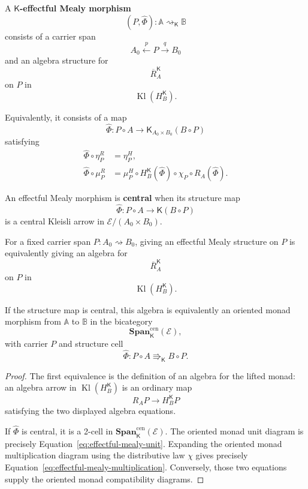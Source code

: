 \begin{definition}
\label{def:effectful-mealy-morphism}
A \textbf{\(\mathsf K\)-effectful Mealy morphism}
\[
    (P,\widehat\Phi):
    \mathbb A\rightsquigarrow_{\mathsf K}\mathbb B
\]
consists of a carrier span
\[
    A_0\xleftarrow{p}P\xrightarrow{q}B_0
\]
and an algebra structure for
\[
    \overline R_A^{\mathsf K}
\]
on \(P\) in
\[
    \operatorname{Kl}(H_B^{\mathsf K}).
\]

Equivalently, it consists of a map
\[
    \widehat\Phi:
    P\circ A
    \longrightarrow
    \mathsf K_{A_0\times B_0}(B\circ P)
\]
satisfying
\begin{align}
    \widehat\Phi\circ\eta^R_P
    &=
    \eta^H_P,
    \label{eq:effectful-mealy-unit}
    \\
    \widehat\Phi\circ\mu^R_P
    &=
    \mu^H_P
    \circ
    H_B^{\mathsf K}(\widehat\Phi)
    \circ
    \chi_P
    \circ
    R_A(\widehat\Phi).
    \label{eq:effectful-mealy-multiplication}
\end{align}
\end{definition}

\begin{definition}
\label{def:central-effectful-mealy-morphism}
An effectful Mealy morphism is \textbf{central} when its structure map
\[
    \widehat\Phi:
    P\circ A
    \longrightarrow
    \mathsf K(B\circ P)
\]
is a central Kleisli arrow in
\(\mathcal E/(A_0\times B_0)\).
\end{definition}

\begin{theorem}
\label{thm:effectful-mealy-algebra-theorem}
For a fixed carrier span \(P:A_0\rightsquigarrow B_0\), giving an effectful
Mealy structure on \(P\) is equivalently giving an algebra for
\[
    \overline R_A^{\mathsf K}
\]
on \(P\) in
\[
    \operatorname{Kl}(H_B^{\mathsf K}).
\]

If the structure map is central, this algebra is equivalently an oriented
monad morphism from \(\mathbb A\) to \(\mathbb B\) in the bicategory
\[
    \mathbf{Span}^{\mathrm{cen}}_{\mathsf K}(\mathcal E),
\]
with carrier \(P\) and structure cell
\[
    \widehat\Phi:
    P\circ A
    \Rrightarrow_{\mathsf K}
    B\circ P.
\]
\end{theorem}

\begin{proof}
The first equivalence is the definition of an algebra for the lifted monad:
an algebra arrow in \(\operatorname{Kl}(H_B^{\mathsf K})\) is an ordinary map
\[
    R_AP
    \longrightarrow
    H_B^{\mathsf K}P
\]
satisfying the two displayed algebra equations.

If \(\widehat\Phi\) is central, it is a 2-cell in
\(\mathbf{Span}^{\mathrm{cen}}_{\mathsf K}(\mathcal E)\).  The oriented monad
unit diagram is precisely
Equation~\eqref{eq:effectful-mealy-unit}.  Expanding the oriented monad
multiplication diagram using the distributive law \(\chi\) gives precisely
Equation~\eqref{eq:effectful-mealy-multiplication}.  Conversely, those two
equations supply the oriented monad compatibility diagrams.
\end{proof}

